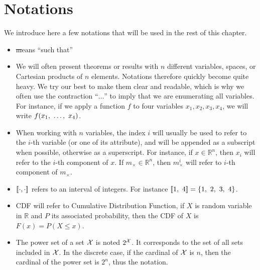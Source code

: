 \section{Notations}
We introduce here a few notations that will be used in the rest of this chapter.  
\begin{itemize}
    \item \st means ``such that''
    \item We will often present theorems or results with $n$ different variables, spaces, or Cartesian products of $n$ elements. Notations therefore quickly become quite heavy. We try our best to make them clear and readable, which is why we often use the contraction ``$\dots$'' to imply that we are enumerating all variables. For instance, if we apply a function $f$ to four variables $x_1, x_2, x_3, x_4$, we will write $f(x_1, ~\dots, ~ x_4)$.
    \item When working with $n$ variables, the index $i$ will usually be used to refer to the $i$-th variable (or one of its attribute), and will be appended as a subscript when possible, otherwise as a superscript. For instance, if $x\in\mathbb{R}^n$, then $x_i$ will refer to the $i$-th component of $x$. If $m_\times\in\mathbb{R}^n$, then $m_\times^i$ will refer to $i$-th component of $m_\times$.
    \item $[\![\cdot,\cdot]\!]$ refers to an interval of integers. For instance $[\![1,~4]\!]=\{1,~2,~3,~4\}$. 
    \item CDF will refer to Cumulative Distribution Function, \ie if $X$ is random variable in $\mathbb{R}$ and $P$ its associated probability, then the CDF of $X$ is $F(x)=P(X\leqslant x)$.
    \item The power set of a set $\mathcal{X}$ is noted $2^{\mathcal{X}}$. It corresponds to the set of all sets included in $\mathcal{X}$. In the discrete case, if the cardinal of $\mathcal{X}$ is $n$, then the cardinal of the power set is $2^n$, thus the notation.
\end{itemize}

